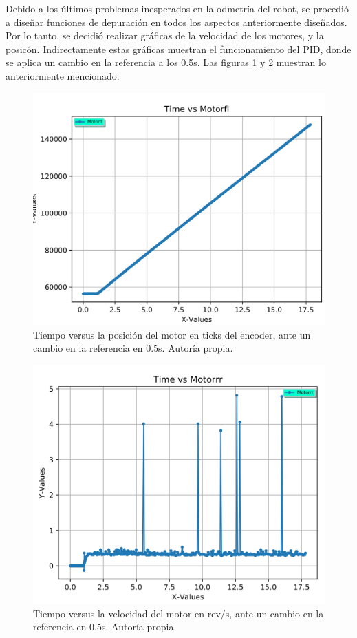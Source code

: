 Debido a los últimos problemas inesperados en la odmetría del robot, se procedió a diseñar funciones de depuración en todos los aspectos anteriormente diseñados. Por lo tanto, se decidió realizar gráficas de la velocidad de los motores, y la posicón. Indirectamente estas gráficas muestran el funcionamiento del PID, donde se aplica un cambio en la referencia a los 0.5s. Las figuras \ref{F:pidposicion} y \ref{F:pidvelocidad} muestran lo anteriormente mencionado.

\begin{figure}[H]
\centering
\includegraphics[scale=0.3]{imagenes/posicionpidmotorrr.png}
\caption{Tiempo versus la posición del motor en ticks del encoder, ante un cambio en la referencia en 0.5s. Autoría propia.}
\label{F:pidposicion}
\end{figure}

\begin{figure}[H]
\centering
\includegraphics[scale=0.3]{imagenes/velocidadpidmotorrr.png}
\caption{Tiempo versus la velocidad del motor en rev/s, ante un cambio en la referencia en 0.5s. Autoría propia.}
\label{F:pidvelocidad}
\end{figure}

